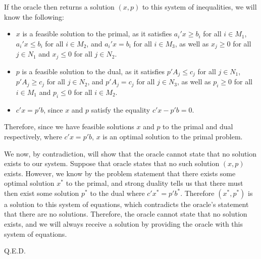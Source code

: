 If the oracle then returns a solution $(x, p)$ to this system of inequalities, we will know the following:

\begin{itemize}
\item $x$ is a feasible solution to the primal, as it satisfies $a_i'x\geq b_i$ for all $i\in M_1$, $a_i'x\leq b_i$ for all $i\in M_2$, and $a_i'x=b_i$ for all $i\in M_3$, as well as $x_j\geq 0$ for all $j\in N_1$ and $x_j\leq 0$ for all $j\in N_2$.
\item $p$ is a feasible solution to the dual, as it satisfies $p'A_j\leq c_j$ for all $j\in N_1$, $p'A_j\geq c_j$ for all $j\in N_2$, and $p'A_j=c_j$ for all $j\in N_3$, as well as $p_i\geq 0$ for all $i\in M_1$ and $p_i\leq 0$ for all $i\in M_2$.
\item $c'x=p'b$, since $x$ and $p$ satisfy the equality $c'x-p'b=0$.
\end{itemize}

Therefore, since we have feasible solutions $x$ and $p$ to the primal and dual respectively, where $c'x=p'b$, $x$ is an optimal solution to the primal problem.

We now, by contradiction, will show that the oracle cannot state that no solution exists to our system. Suppose that oracle states that no such solution $(x, p)$ exists. However, we know by the problem statement that there exists some optimal solution $x^*$ to the primal, and strong duality tells us that there must then exist some solution $p^*$ to the dual where $c'x^*=p'b^*$. Therefore $(x^*, p^*)$ is a solution to this system of equations, which contradicts the oracle's statement that there are no solutions. Therefore, the oracle cannot state that no solution exists, and we will always receive a solution by providing the oracle with this system of equations.

Q.E.D.